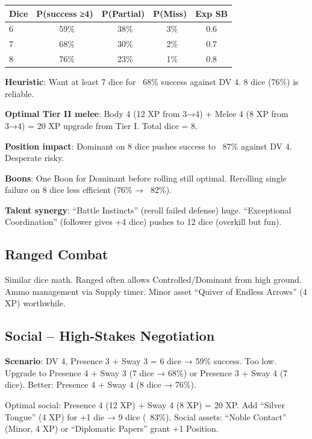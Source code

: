 \documentclass[11pt]{article}
\begin{document}
\begin{table}[h]
\centering
\begin{tabular}{lcccc}
\toprule
\textbf{Dice} & \textbf{P(success ≥4)} & \textbf{P(Partial)} & \textbf{P(Miss)} & \textbf{Exp SB} \\
\midrule
6 & ~59\% & ~38\% & ~3\% & 0.6 \\
7 & ~68\% & ~30\% & ~2\% & 0.7 \\
8 & ~76\% & ~23\% & ~1\% & 0.8 \\
\bottomrule
\end{tabular}
\end{table}

\textbf{Heuristic}: Want at least 7 dice for ~68\% success against DV 4. 8 dice (76\%) is reliable.

\textbf{Optimal Tier II melee}: Body 4 (12 XP from 3→4) + Melee 4 (8 XP from 3→4) = 20 XP upgrade from Tier I. Total dice = 8.

\textbf{Position impact}: Dominant on 8 dice pushes success to ~87\% against DV 4. Desperate risky.

\textbf{Boons}: One Boon for Dominant before rolling still optimal. Rerolling single failure on 8 dice less efficient (76\% → ~82\%).

\textbf{Talent synergy}: ``Battle Instincts'' (reroll failed defense) huge. ``Exceptional Coordination'' (follower gives +4 dice) pushes to 12 dice (overkill but fun).

\subsection{Ranged Combat}
Similar dice math. Ranged often allows Controlled/Dominant from high ground. Ammo management via Supply timer. Minor asset ``Quiver of Endless Arrows'' (4 XP) worthwhile.

\subsection{Social – High-Stakes Negotiation}
\textbf{Scenario}: DV 4, Presence 3 + Sway 3 = 6 dice → 59\% success. Too low. Upgrade to Presence 4 + Sway 3 (7 dice → 68\%) or Presence 3 + Sway 4 (7 dice). Better: Presence 4 + Sway 4 (8 dice → 76\%).

Optimal social: Presence 4 (12 XP) + Sway 4 (8 XP) = 20 XP. Add ``Silver Tongue'' (4 XP) for +1 die → 9 dice (~83\%). Social assets: ``Noble Contact'' (Minor, 4 XP) or ``Diplomatic Papers'' grant +1 Position.
\end{document}
